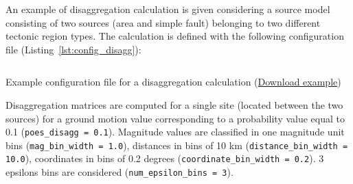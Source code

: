 An example of disaggregation calculation is given considering a source model
consisting of two sources (area and simple fault) belonging to two different
tectonic region types. The calculation is defined with the following configuration
file (Listing~\ref{lst:config_disagg}):

\begin{listing}[htbp]
  \inputminted[firstline=1,firstnumber=1,fontsize=\footnotesize,frame=single,linenos,bgcolor=lightgray,label=job.ini]{ini}{oqum/hazard/verbatim/config_disagg.ini}
  \caption{Example configuration file for a disaggregation calculation (\href{https://raw.githubusercontent.com/gem/oq-engine/master/doc/manual/oqum/hazard/verbatim/config_disagg.ini}{Download example})}
  \label{lst:config_disagg}
\end{listing}

Disaggregation matrices are computed for a single site (located between the
two sources) for a ground motion value corresponding to a probability value
equal to 0.1 (\texttt{poes\_\-disagg = 0.1}). Magnitude values are classified
in one magnitude unit bins (\texttt{mag\_\-bin\_\-width = 1.0}), distances in
bins of 10 km (\texttt{distance\_\-bin\_\-width = 10.0}), coordinates in bins
of 0.2 degrees (\texttt{coordinate\_\-bin\_\-width = 0.2}). 3 epsilons bins
are considered (\texttt{num\_\-epsilon\_\-bins = 3}).
